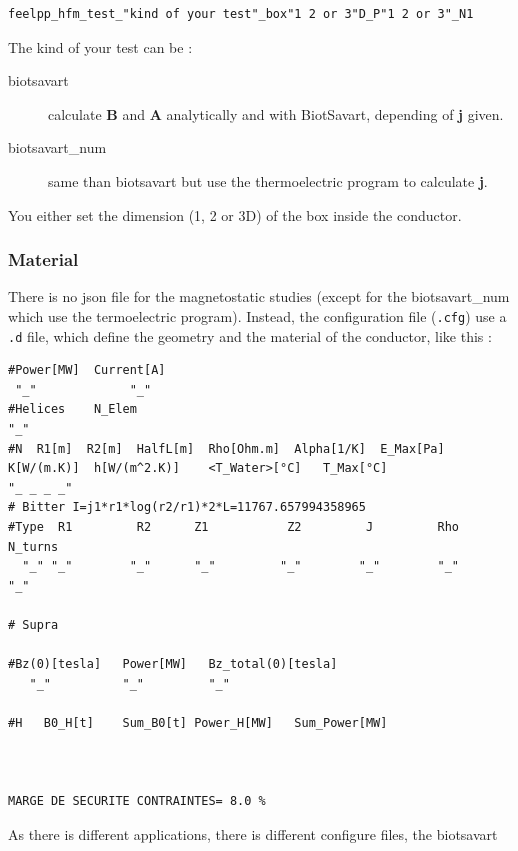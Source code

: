 \documentclass[11pt]{amsart}
\begin{document}
\begin{verbatim}
feelpp_hfm_test_"kind of your test"_box"1 2 or 3"D_P"1 2 or 3"_N1
\end{verbatim}

The kind of your test can be :


\begin{description}

\item[biotsavart]calculate \textbf{B} and \textbf{A} analytically and with BiotSavart, depending of \textbf{j} given.

\item[biotsavart_num]same than biotsavart but use the thermoelectric program to calculate \textbf{j}.

\end{description}


You either set the dimension (1, 2 or 3D) of the box inside the conductor.


\hypertarget{x-material}{\subsubsection{Material}}
There is no json file for the magnetostatic studies (except for the biotsavart_num which use the termoelectric program).
Instead, the configuration file (\texttt{.cfg}) use a \texttt{.d} file, which define the geometry and the material of the conductor, like this :


\begin{verbatim}
#Power[MW]	Current[A]
 "_"  		     "_"
#Helices	N_Elem
"_"
#N	R1[m]  R2[m]  HalfL[m]	Rho[Ohm.m]  Alpha[1/K]	E_Max[Pa]	K[W/(m.K)]	h[W/(m^2.K)]	<T_Water>[°C]	T_Max[°C]
"_ _ _ _"
# Bitter I=j1*r1*log(r2/r1)*2*L=11767.657994358965
#Type  R1         R2      Z1           Z2         J         Rho	  	N_turns
  "_" "_"        "_"      "_"         "_"        "_"        "_"      "_"

# Supra

#Bz(0)[tesla]	Power[MW]	Bz_total(0)[tesla]
   "_"          "_"         "_"

#H   B0_H[t]	Sum_B0[t] Power_H[MW]	Sum_Power[MW]



MARGE DE SECURITE CONTRAINTES= 8.0 %
\end{verbatim}

As there is different applications, there is different configure files, the biotsavart
\end{document}
